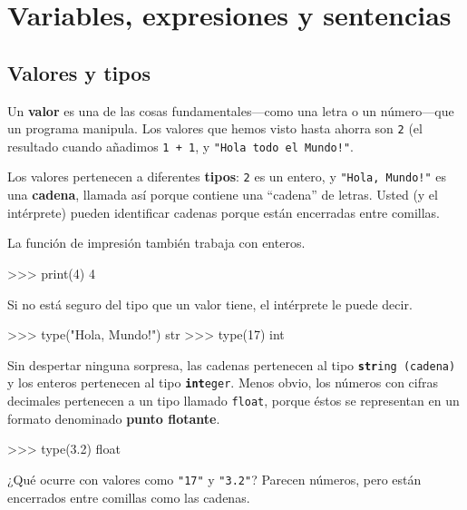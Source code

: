 \chapter{Variables, expresiones y sentencias}

\section{Valores y tipos}

  

Un \textbf{valor} es una de las cosas fundamentales—como una letra
o un número—que un programa manipula. Los valores que hemos visto
hasta ahorra son \texttt{2} (el resultado cuando añadimos \texttt{1
+ 1}, y {\verb+"Hola todo el Mundo!"+}.

Los valores pertenecen a diferentes \textbf{tipos}: \texttt{2} es
un entero, y {\verb+"Hola, Mundo!"+} es una \textbf{cadena}, llamada
así porque contiene una ``cadena'' de letras. Usted (y el intérprete)
pueden identificar cadenas porque están encerradas entre comillas.

La función de impresión también trabaja con enteros.

\begin{pyconcode}
>>> print(4)
4
\end{pyconcode}


Si no está seguro del tipo que un valor tiene, el intérprete le puede
decir.

\begin{pyconcode}
>>> type("Hola, Mundo!")
str
>>> type(17)
int
\end{pyconcode}


Sin despertar ninguna sorpresa, las cadenas pertenecen al tipo \texttt{\textbf{str}}\texttt{ing
(cadena)} y los enteros pertenecen al tipo \texttt{\textbf{int}}\texttt{eger}.
Menos obvio, los números con cifras decimales pertenecen a un tipo
llamado \texttt{float}, porque éstos se representan en un formato
denominado \textbf{punto flotante}.

    
 

\begin{pyconcode}
>>> type(3.2)
float
\end{pyconcode}

¿Qué ocurre con valores como {\verb+"17"+} y {\verb+"3.2"+}?
Parecen números, pero están encerrados entre comillas como las cadenas.

